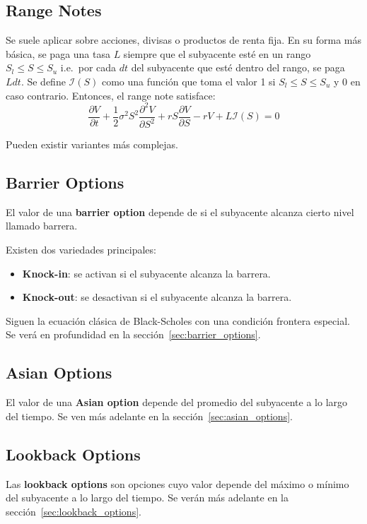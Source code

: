 \subsection{Range Notes}\label{sec:clas_range_notes}
Se suele aplicar sobre acciones, divisas o productos de renta fija. En su forma más básica, se paga una tasa $L$ siempre que el subyacente esté en un rango $S_l \leq S \leq S_u$ i.e.\ por cada $dt$ del subyacente que esté dentro del rango, se paga $L dt$. Se define $\mathcal{I}(S)$ como una función que toma el valor 1 si $S_l \leq S \leq S_u$ y 0 en caso contrario. Entonces, el range note satisface:
\[
    \boxed{\frac{\partial V}{\partial t} + \frac{1}{2}\sigma^2 S^2 \frac{\partial^2 V}{\partial S^2} + r S \frac{\partial V}{\partial S} - r V + L \mathcal{I}(S) = 0}
\]

Pueden existir variantes más complejas.



\subsection{Barrier Options}
El valor de una \textbf{barrier option} depende de si el subyacente alcanza cierto nivel llamado barrera.

Existen dos variedades principales:
\begin{itemize}
    \item \textbf{Knock-in}: se activan si el subyacente alcanza la barrera.
    \item \textbf{Knock-out}: se desactivan si el subyacente alcanza la barrera.
\end{itemize}

Siguen la ecuación clásica de Black-Scholes con una condición frontera especial. Se verá en profundidad en la sección~\ref{sec:barrier_options}.





\subsection{Asian Options}
El valor de una \textbf{Asian option} depende del promedio del subyacente a lo largo del tiempo. Se ven más adelante en la sección~\ref{sec:asian_options}.



\subsection{Lookback Options}
Las \textbf{lookback options} son opciones cuyo valor depende del máximo o mínimo del subyacente a lo largo del tiempo. Se verán más adelante en la sección~\ref{sec:lookback_options}.








